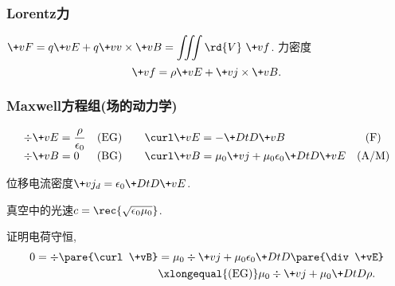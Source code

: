 \documentclass[hidelinks]{ctexart}
\begin{document}
\subsubsection{Lorentz力} %
\label{ssub:lorentz力}

$\displaystyle \+vF = q\+vE + q\+vv\times \+vB = \iiint \rd{V}\ \+vf$. 力密度
\[ \+vf = \rho \+vE + \+vj\times \+vB. \]


\subsubsection{Maxwell方程组(场的动力学)} %
\label{ssub:maxwell方程组}

\vspace{-\baselineskip}
\[ \displaystyle \begin{array}{lcclc}
    \displaystyle \div \+vE = \frac{\rho}{\epsilon_0} & \text{(EG)} &&\displaystyle  \curl \+vE = -\+DtD{\+vB} & \text{(F)} \\
    \displaystyle \div \+vB = 0 & \text{(BG)} &&\displaystyle  \curl \+vB = \mu_0 \+vj + \mu_0\epsilon_0 \+DtD{\+vE} & \text{(A/M)}
\end{array} \]
\begin{cenum}
    \item 位移电流密度$\displaystyle \+vj_d = \epsilon_0 \+DtD{\+vE}$.
    \item 真空中的光速$\displaystyle c = \rec{\sqrt{\epsilon_0\mu_0}}$.
\end{cenum}
\begin{ex}
    证明电荷守恒,
    \begin{align*}
        0 = \div\pare{\curl \+vB} &= \mu_0 \div \+vj + \mu_0 \epsilon_0 \+DtD{}\pare{\div \+vE} \\
        &\xlongequal{\text{(EG)}} \mu_0 \div \+vj + \mu_0 \+DtD{\rho}.
    \end{align*}
\end{ex}
\end{document}

